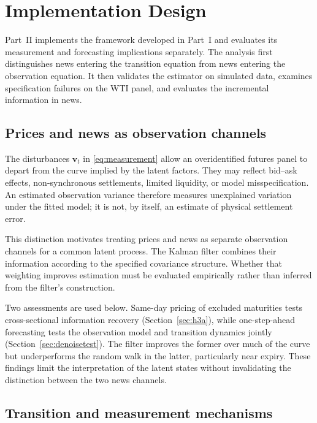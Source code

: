 \documentclass[journal]{IEEEtran}
\begin{document}
\section{Implementation Design}
\label{sec:implementation}

Part~II implements the framework developed in Part~I and evaluates its measurement and forecasting implications separately. The analysis first distinguishes news entering the transition equation from news entering the observation equation. It then validates the estimator on simulated data, examines specification failures on the WTI panel, and evaluates the incremental information in news.

\subsection{Prices and news as observation channels}
\label{sec:instrument}

The disturbances $\bm{v}_t$ in \eqref{eq:measurement} allow an overidentified futures panel to depart from the curve implied by the latent factors. They may reflect bid--ask effects, non-synchronous settlements, limited liquidity, or model misspecification. An estimated observation variance therefore measures unexplained variation under the fitted model; it is not, by itself, an estimate of physical settlement error.

This distinction motivates treating prices and news as separate observation channels for a common latent process. The Kalman filter combines their information according to the specified covariance structure. Whether that weighting improves estimation must be evaluated empirically rather than inferred from the filter's construction.

Two assessments are used below. Same-day pricing of excluded maturities tests cross-sectional information recovery (Section~\ref{sec:h3a}), while one-step-ahead forecasting tests the observation model and transition dynamics jointly (Section~\ref{sec:denoisetest}). The filter improves the former over much of the curve but underperforms the random walk in the latter, particularly near expiry. These findings limit the interpretation of the latent states without invalidating the distinction between the two news channels.

\subsection{Transition and measurement mechanisms}
\label{sec:driver-measurement}
\end{document}
